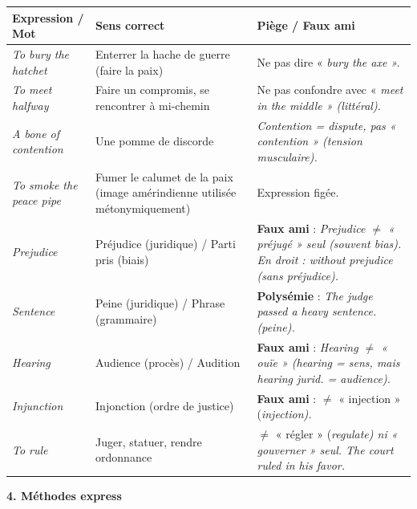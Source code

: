 \documentclass[11pt]{article}
\newcommand{\eng}[1]{\ifmmode\text{\textit{#1}}\else\begingroup\selectlanguage{english}\itshape #1\endgroup\fi}
\begin{document}
\begin{bilan}
\begin{center}
\begin{tabularx}{\linewidth}{|X|X|X|}
\hline
\rowcolor{popblueL}
\textbf{Expression / Mot} & \textbf{Sens correct} & \textbf{Piège / Faux ami} \\
\hline
\eng{To bury the hatchet} & Enterrer la hache de guerre (faire la paix) & Ne pas dire « \eng{bury the axe} ». \\
\eng{To meet halfway} & Faire un compromis, se rencontrer à mi-chemin & Ne pas confondre avec « \eng{meet in the middle} » (littéral). \\
\eng{A bone of contention} & Une pomme de discorde & \eng{Contention} = dispute, pas « contention » (tension musculaire). \\
\eng{To smoke the peace pipe} & Fumer le calumet de la paix (image amérindienne utilisée métonymiquement) & Expression figée. \\
\eng{Prejudice} & Préjudice (juridique) / Parti pris (biais) & \textbf{Faux ami} : \eng{Prejudice} $\neq$ « préjugé » seul (souvent \eng{bias}). En droit : \eng{without prejudice} (sans préjudice). \\
\eng{Sentence} & Peine (juridique) / Phrase (grammaire) & \textbf{Polysémie} : \eng{The judge passed a heavy sentence.} (peine). \\
\eng{Hearing} & Audience (procès) / Audition & \textbf{Faux ami} : \eng{Hearing} $\neq$ « ouïe » (\eng{hearing} = sens, mais \eng{hearing} jurid. = audience). \\
\eng{Injunction} & Injonction (ordre de justice) & \textbf{Faux ami} : $\neq$ « injection » (\eng{injection}). \\
\eng{To rule} & Juger, statuer, rendre ordonnance & $\neq$ « régler » (\eng{regulate}) ni « gouverner » seul. \eng{The court ruled in his favor.} \\
\hline
\end{tabularx}
\end{center}

\textbf{4. Méthodes express}

\end{bilan}
\end{document}
